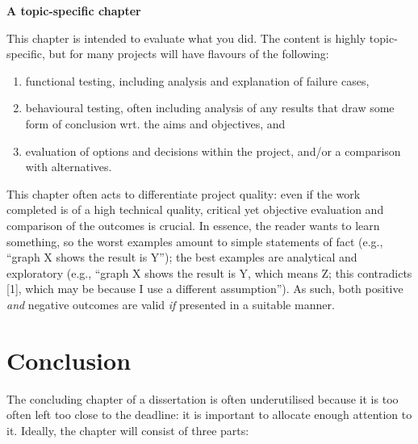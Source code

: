 \documentclass[ oneside,%
                    author={James Elgar},
                    degree={MEng},
                     title={Bidirectional transformer between functional and \\ object-oriented programming in Rust},
                  subtitle={}]{dissertation}
\begin{document}
{\bf A topic-specific chapter} 
\vspace{1cm} 

\noindent
This chapter is intended to evaluate what you did.  The content is highly 
topic-specific, but for many projects will have flavours of the following:

\begin{enumerate}
\item functional  testing, including analysis and explanation of failure 
      cases,
\item behavioural testing, often including analysis of any results that 
      draw some form of conclusion wrt. the aims and objectives,
      and
\item evaluation of options and decisions within the project, and/or a
      comparison with alternatives.
\end{enumerate}

\noindent
This chapter often acts to differentiate project quality: even if the work
completed is of a high technical quality, critical yet objective evaluation 
and comparison of the outcomes is crucial.  In essence, the reader wants to
learn something, so the worst examples amount to simple statements of fact 
(e.g., ``graph X shows the result is Y''); the best examples are analytical 
and exploratory (e.g., ``graph X shows the result is Y, which means Z; this 
contradicts [1], which may be because I use a different assumption'').  As 
such, both positive {\em and} negative outcomes are valid {\em if} presented 
in a suitable manner.


\chapter{Conclusion}
\label{chap:conclusion}

\noindent
The concluding chapter of a dissertation is often underutilised because it 
is too often left too close to the deadline: it is important to allocate
enough attention to it.  Ideally, the chapter will consist of three parts:
\end{document}
